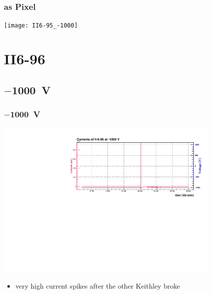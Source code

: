 \documentclass[9pt]{beamer}
\begin{document}
\begin{frame}
	\frametitle{as Pixel}
	\vspace*{-15pt}
	\begin{center}
		\texttt{[image: II6-95\_-1000]}
	\end{center}
\end{frame}
\section{II6-96}
\subsection{$-$\SI{1000}{V}}
\begin{frame}
	\frametitle{$-$\SI{1000}{V}}
	\vspace*{-15pt}
	\begin{center}
		\includegraphics[angle=270, width=11cm]{II-6-96_-1000}
	\end{center}
	\begin{itemize}
		\item very high current spikes after the other Keithley broke
	\end{itemize}
\end{frame}
\end{document}
